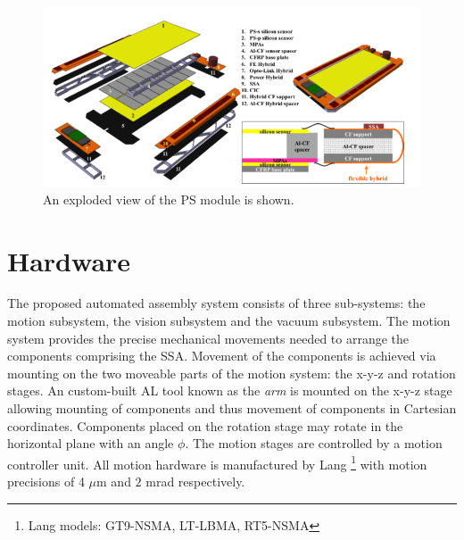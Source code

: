 \documentclass[fleqn,10pt]{SelfArx} %
\begin{document}
\begin{figure}[ht]\centering %
\includegraphics[width=\linewidth]{PS.png}
\caption{An exploded view of the PS module is shown.}
\label{fig:PS}
\end{figure}





\section{Hardware}
The proposed automated assembly system consists of three sub-systems: the motion subsystem, the vision subsystem and the vacuum subsystem. 
The motion system provides the precise mechanical movements needed to arrange the components comprising the SSA. Movement of the components is achieved via mounting on the two moveable parts of the motion
system: the x-y-z and rotation stages. An custom-built AL tool known as the \emph{arm} is mounted on the x-y-z stage allowing mounting of components and thus movement of components in Cartesian coordinates. Components placed on the rotation stage may rotate in the horizontal plane with an angle $\phi$. The motion stages are controlled by a motion controller unit. All motion hardware is manufactured by Lang \footnote{Lang models: GT9-NSMA, LT-LBMA, RT5-NSMA} with motion precisions of 4 $\mu$m and $2$ mrad respectively. 
\end{document}

